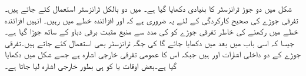 
شکل  میں دو جوڑ ٹرانزسٹر کا بنیادی  دکھایا گیا ہے۔ میں دو بالکل  ٹرانزسٹر  استعمال کئے جاتے ہیں۔تفرقی جوڑے کی صحیح کارکردگی کے لئے یہ ضروری ہے کہ   اور   افزائندہ خطے میں رہیں۔ انہیں افزائندہ خطے میں رکھنے کی خاطر تفرقی جوڑے کو  کی مدد سے منبع مثبت برقی دباو   کے ساتھ جوڑا گیا ہے۔جیسا کہ اسی باب میں بعد میں دکھایا جائے گا  کی جگہ ٹرانزسٹر بھی استعمال کئے جاتے ہیں۔تفرقی جوڑے کے دو داخلی اشارات  اور  ہیں جبکہ اس کا عمومی تفرقی خارجی اشارہ  ہے جسے شکل   میں دکھایا گیا ہے۔بعض اوقات   یا   کو ہی بطور خارجی اشارہ  لیا جاتا ہے۔


